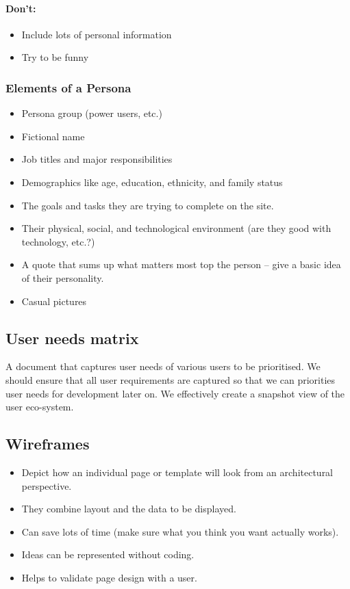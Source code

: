\paragraph{Don't:}\label{par:don_t}

\begin{itemize}
	\item Include lots of personal information
	\item Try to be funny
\end{itemize}

\subsubsection{Elements of a Persona}\label{ssub:elements_of_a_persona}

\begin{itemize}
	\item Persona group (power users, etc.)
	\item Fictional name
	\item Job titles and major responsibilities
	\item Demographics like age, education, ethnicity, and family status
	\item The goals and tasks they are trying to complete on the site.
	\item Their physical, social, and technological environment (are they good with technology, etc.?)
	\item A quote that sums up what matters most top the person -- give a basic idea of their personality.
	\item Casual pictures
\end{itemize}

\subsection{User needs matrix}\label{sub:user_needs_matrix}

A document that captures user needs of various users to be prioritised.
We should ensure that all user requirements are captured so that we can priorities user needs for development later on.
We effectively create a snapshot view of the user eco-system.

\subsection{Wireframes}\label{sub:wireframes_was}

\begin{itemize}
	\item Depict how an individual page or template will look from an architectural perspective.
	\item They combine layout and the data to be displayed.
	\item Can save lots of time (make sure what you think you want actually works).
	\item Ideas can be represented without coding.
	\item Helps to validate page design with a user.
\end{itemize}

